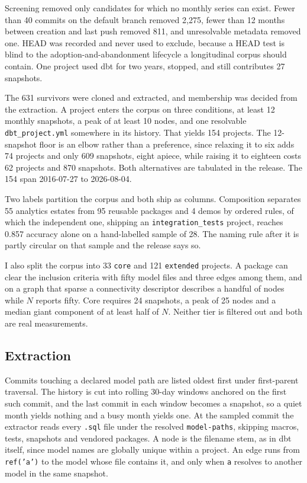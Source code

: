 \documentclass[10pt,conference]{IEEEtran}
\begin{document}
Screening removed only candidates for which no monthly series can exist. Fewer
than 40 commits on the default branch removed 2{,}275, fewer than 12 months
between creation and last push removed 811, and unresolvable metadata removed
one. HEAD was recorded and never used to exclude, because a HEAD test is blind
to the adoption-and-abandonment lifecycle a longitudinal corpus should contain.
One project used dbt for two years, stopped, and still contributes 27
snapshots.

The 631 survivors were cloned and extracted, and membership was decided from the
extraction. A project enters the corpus on three conditions, at least 12 monthly
snapshots, a peak of at least 10 nodes, and one resolvable
\texttt{dbt\_project.yml} somewhere in its history. That yields 154 projects.
The 12-snapshot floor is an elbow rather than a preference, since relaxing it to
six adds 74 projects and only 609 snapshots, eight apiece, while raising it to
eighteen costs 62 projects and 870 snapshots. Both alternatives are tabulated in
the release. The 154 span 2016-07-27 to 2026-08-04.

Two labels partition the corpus and both ship as columns. Composition separates
55 analytics estates from 95 reusable packages and 4 demos by ordered rules, of
which the independent one, shipping an \texttt{integration\_tests} project,
reaches 0.857 accuracy alone on a hand-labelled sample of 28. The naming rule
after it is partly circular on that sample and the release says so.

I also split the corpus into 33 \texttt{core} and 121 \texttt{extended}
projects. A package can clear the inclusion criteria with fifty model files and three
edges among them, and on a graph that sparse a connectivity descriptor describes
a handful of nodes while $N$ reports fifty. Core requires
24 snapshots, a peak of 25 nodes and a median giant component of at least half
of $N$. Neither tier is filtered out and both are real measurements.

\subsection{Extraction}

Commits touching a declared model path are listed oldest first under
first-parent traversal. The history is cut into rolling 30-day windows anchored
on the first such commit, and the last commit in each window becomes a snapshot,
so a quiet month yields nothing and a busy month yields one. At the sampled
commit the extractor reads every \texttt{.sql} file under the resolved
\texttt{model-paths}, skipping macros, tests, snapshots and vendored packages. A
node is the filename stem, as in dbt itself, since model names are globally
unique within a project. An edge runs from \texttt{ref('a')} to the
model whose file contains it, and only when \texttt{a} resolves to another model
in the same snapshot.
\end{document}
